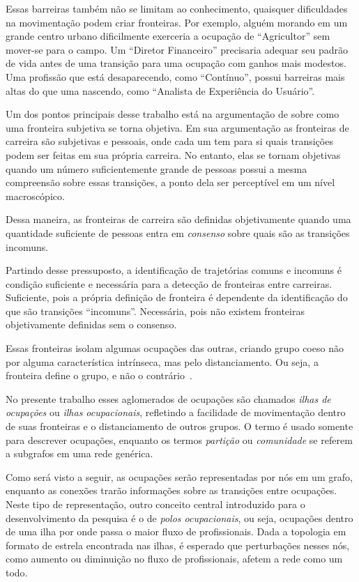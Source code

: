 \documentclass[
  article,
  11pt,
  a4paper,
  english,
  brazil,
  sumario=tradicional]{abntex2}
\begin{document}
Essas barreiras também não se limitam ao conhecimento, quaisquer dificuldades na movimentação podem criar fronteiras. Por exemplo, alguém morando em um grande centro urbano dificilmente exerceria a ocupação de \enquote{Agricultor} sem mover-se para o campo. Um \enquote{Diretor Financeiro} precisaria adequar seu padrão de vida antes de uma transição para uma ocupação com ganhos mais modestos. Uma profissão que está desaparecendo, como \enquote{Contínuo}, possui barreiras mais altas do que uma nascendo, como \enquote{Analista de Experiência do Usuário}.

Um dos pontos principais desse trabalho está na argumentação de  sobre como uma fronteira subjetiva se torna objetiva. Em sua argumentação as fronteiras de carreira são subjetivas e pessoais, onde cada um tem para si quais transições podem ser feitas em sua própria carreira. No entanto, elas se tornam objetivas quando um número suficientemente grande de pessoas possui a mesma compreensão sobre essas transições, a ponto dela ser perceptível em um nível macroscópico.

Dessa maneira, as fronteiras de carreira são definidas objetivamente quando uma quantidade suficiente de pessoas entra em \textit{consenso} sobre quais são as transições incomuns.

Partindo desse pressuposto, a identificação de trajetórias comuns e incomuns é condição suficiente e necessária para a detecção de fronteiras entre carreiras. Suficiente, pois a própria definição de fronteira é dependente da identificação do que são transições \enquote{incomuns}. Necessária, pois não existem fronteiras objetivamente definidas sem o consenso.

Essas fronteiras isolam algumas ocupações das outras, criando grupo coeso não por alguma característica intrínseca, mas pelo distanciamento.  Ou seja, a fronteira define o grupo, e não o contrário~\cite{Gunz2007-hr,Abbott1995-ft}. 

No presente trabalho esses aglomerados de ocupações são chamados \textit{ilhas de ocupações} ou \textit{ilhas ocupacionais}, refletindo a facilidade de movimentação dentro de suas fronteiras e o distanciamento de outros grupos. O termo é usado somente para descrever ocupações, enquanto os termos \textit{partição} ou \textit{comunidade} se referem a subgrafos em uma rede genérica.

Como será visto a seguir, as ocupações serão representadas por nós em um grafo, enquanto as conexões trarão informações sobre as transições entre ocupações. Neste tipo de representação, outro conceito central introduzido para o desenvolvimento da pesquisa é o de \textit{polos ocupacionais}, ou seja, ocupações dentro de uma ilha por onde passa o maior fluxo de profissionais. Dada a topologia em formato de estrela encontrada nas ilhas, é esperado que perturbações nesses nós, como aumento ou diminuição no fluxo de profissionais, afetem a rede como um todo\cite{Callaway2000-ug}.
\end{document}
